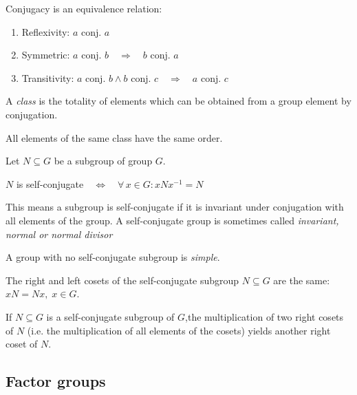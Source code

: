 \begin{thm}\label{thm:14_conj-eqv}
Conjugacy is an equivalence relation:
\begin{enumerate}
	\item Reflexivity: $a$ conj. $a$
	\item Symmetric: $a$ conj. $b \quad \Rightarrow \quad b$ conj. $a$
	\item Transitivity: $a$ conj. $b \wedge b$ conj. $c \quad \Rightarrow \quad a$ conj. $c$
\end{enumerate}
\end{thm}

\begin{dfn}[Class]\label{dfn:16_class}
A \textit{class} is the totality of elements which can be obtained from a group element by conjugation.
\end{dfn}

\begin{thm}\label{thm:15_class-order}
All elements of the same class have the same order. 
\end{thm}

\begin{dfn}\label{dfn:17_self-conj}
Let $N \subseteq G$ be a subgroup of group $G$. \par
$N$  is self-conjugate$\quad \Leftrightarrow \quad \forall \, x \in G: xNx^{-1} = N$ 
\end{dfn}
This means a subgroup is self-conjugate if it is invariant under conjugation with all elements of the group. A self-conjugate group is sometimes called \textit{invariant, normal or normal divisor} 

\begin{dfn}\label{dfn:18_simple-gr}
A group with no self-conjugate subgroup is \textit{simple}.
\end{dfn}

\begin{thm}\label{thm:16_lr-cosets}
The right and left cosets of the self-conjugate subgroup $N \subseteq G$ are the same: $xN = Nx, \; x \in G$. 
\end{thm}

\begin{thm}\label{thm:17_multipl-cosets}
If $N \subseteq G$ is a self-conjugate subgroup of $G$,the multiplication of two right cosets of $N$ (i.e. the multiplication of all elements of the cosets) yields another right coset of $N$. 
\end{thm}

\subsection{Factor groups}

